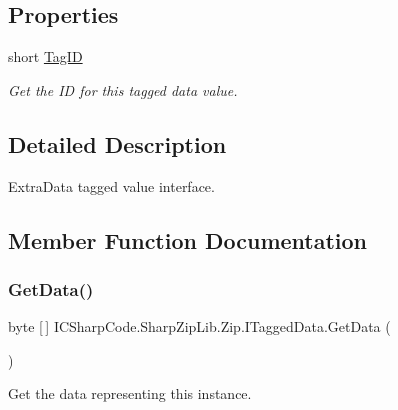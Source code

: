 \subsection*{Properties}
\begin{DoxyCompactItemize}
\item 
short \hyperlink{interface_i_c_sharp_code_1_1_sharp_zip_lib_1_1_zip_1_1_i_tagged_data_ab059d0e5f269940bfb50af9e5fbc4bd9}{Tag\+ID}
\begin{DoxyCompactList}\small\item\em Get the ID for this tagged data value. \end{DoxyCompactList}\end{DoxyCompactItemize}


\subsection{Detailed Description}
Extra\+Data tagged value interface. 



\subsection{Member Function Documentation}
\mbox{\label{interface_i_c_sharp_code_1_1_sharp_zip_lib_1_1_zip_1_1_i_tagged_data_a1534d99dec9f2bc6652875e66fba50e6}} 
\subsubsection{\texorpdfstring{Get\+Data()}{GetData()}\hspace{0.1cm}{\footnotesize\ttfamily [1/2]}}
{\footnotesize\ttfamily byte \mbox{[}$\,$\mbox{]} I\+C\+Sharp\+Code.\+Sharp\+Zip\+Lib.\+Zip.\+I\+Tagged\+Data.\+Get\+Data (\begin{DoxyParamCaption}{ }\end{DoxyParamCaption})}



Get the data representing this instance. 

